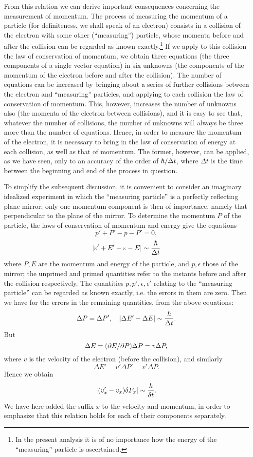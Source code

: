 From this relation we can derive important consequences concerning the measurement of momentum. The process of measuring the momentum of a particle (for definiteness, we shall speak of an electron) consists in a collision of the electron with some other (“measuring”) particle, whose momenta before and after the collision can be regarded as known exactly.\footnote{In the present analysis it is of no importance how the energy of the “measuring” particle is ascertained.} If we apply to this collision the law of conservation of momentum, we obtain three equations (the three components of a single vector equation) in six unknowns (the components of the momentum of the electron before and after the collision). The number of equations can be increased by bringing about a series of further collisions between the electron and “measuring” particles, and applying to each collision the law of conservation of momentum. This, however, increases the number of unknowns also (the momenta of the electron between collisions), and it is easy to see that, whatever the number of collisions, the number of unknowns will always be three more than the number of equations. Hence, in order to measure the momentum of the electron, it is necessary to bring in the law of conservation of energy at each collision, as well as that of momentum. The former, however, can be applied, as we have seen, only to an accuracy of the order of $ \hbar/\Delta t $, where $ \Delta t $ is the time between the beginning and end of the process in question.

To simplify the subsequent discussion, it is convenient to consider an imaginary idealized experiment in which the “measuring particle” is a perfectly reflecting plane mirror; only one momentum component is then of importance, namely that perpendicular to the plane of the mirror. To determine the momentum $ P $ of the particle, the laws of conservation of momentum and energy give the equations
\begin{equation}\label{44.3}
p'+P'-p-P'=0,
\end{equation}
\begin{equation}\label{44.4}
|\varepsilon'+E'-\varepsilon-E|\sim\frac{\hbar}{\Delta t}
\end{equation}
where $ P, E $ are the momentum and energy of the particle, and $ p, \epsilon $ those of the mirror; the unprimed and primed quantities refer to the instants before and after the collision respectively. The quantities $ p, p', \epsilon, \epsilon' $ relating to the “measuring particle” can be regarded as known exactly, i.e. the errors in them are zero. Then we have for the errors in the remaining quantities, from the above equations:
\[ \Delta P=\Delta P',\quad |\Delta E'-\Delta E|\sim\frac{\hbar}{\Delta t}. \]
But 
\[ \Delta E = (\partial E/\partial P)\Delta P = v\Delta P, \] 
where $ v $ is the velocity of the electron (before the collision), and similarly 
\[ \Delta E' = v'\Delta P' = v'\Delta P. \]
Hence we obtain
\begin{equation}\label{44.5}
|(v_x'-v_x)\delta P_x|\sim\frac{\hbar}{\delta t}.
\end{equation}
We have here added the suffix $ x $ to the velocity and momentum, in order to emphasize that this relation holds for each of their components separately.

